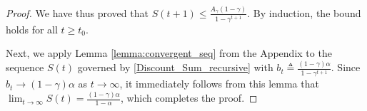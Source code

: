 \documentclass[10pt,a4paper]{amsart}
\begin{document}
\begin{proof}
We have thus proved that $S(t+1)\leq \frac{A_\gamma(1-\gamma)}{1-\gamma^{t+1}}$. By induction, the bound holds for all $t \geq t_0$.

Next, we apply Lemma \ref{lemma:convergent_seq} from the Appendix to the sequence $S(t)$ governed by \eqref{Discount_Sum_recursive} with  $b_t \triangleq \frac{(1-\gamma)\alpha}{1-\gamma^{t+1}}$. Since $b_t{\to}(1{-}\gamma)\alpha$ as $t\to \infty$, it immediately follows from this lemma that $\lim_{t \to \infty} S(t) = \frac{(1-\gamma)\alpha}{1-\alpha}$, which completes the proof.
\end{proof}
\end{document}
